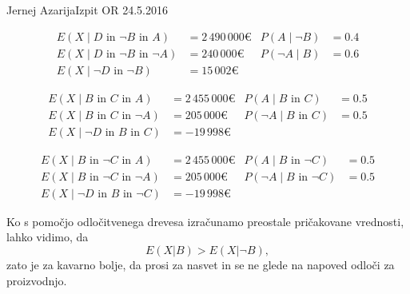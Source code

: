 \begin{naloga}{Jernej Azarija}{Izpit OR 24.5.2016}
\begin{odgovor}
\begin{align*}
E(X \mid D \text{ in }\neg B \text{ in } A) &= 2\, 490\, 000 € & P(A \mid \neg B) &= 0.4\\
E(X \mid D \text{ in } \neg B \text{ in } \neg A) &= 240\, 000 € & P(\neg A \mid B)& = 0.6 \\
E(X \mid \neg D \text{ in } \neg B) &= 15 \, 002 €
\end{align*}

\begin{align*}
E(X \mid B \text{ in }C \text{ in } A) &=2\,455\, 000 € & P(A \mid B \text{ in } C) &= 0.5\\
E(X \mid B \text{ in }C \text{ in }\neg A) &=205\, 000 € & P(\neg A \mid B \text{ in } C) &= 0.5\\
E(X \mid \neg D \text{ in } B \text{ in } C) &= -19\, 998 €
\end{align*}

\begin{align*}
E(X \mid B \text{ in } \neg C \text{ in } A) &=2\, 455\, 000 € & P(A \mid B \text{ in } \neg C) &= 0.5\\
E(X \mid B \text{ in } \neg C \text{ in }\neg A) &=205\, 000 € & P(\neg A \mid B \text{ in } \neg C) &= 0.5\\
E(X \mid \neg D \text{ in } B \text{ in } \neg C) &= -19\, 998 €
\end{align*}


Ko s pomočjo odločitvenega drevesa izračunamo preostale pričakovane vrednosti, lahko vidimo, da
$$
 E(X|B) > E(X|\neg B) ,
$$
zato je za kavarno bolje, da prosi za nasvet in se ne glede na napoved odloči za proizvodnjo.
\end{odgovor}
\end{naloga}
